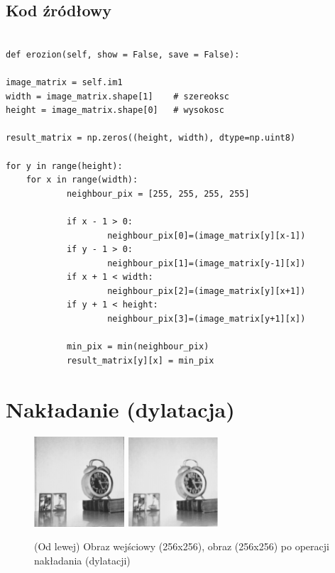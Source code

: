 \documentclass[final,a4paper,openany,12pt]{mwbk}
\begin{document}
\subsection*{Kod źródłowy}

\begin{lstlisting}[caption= Operacja okrawania (erozji) na obrazie szarym]

def erozion(self, show = False, save = False):

image_matrix = self.im1
width = image_matrix.shape[1]    # szereoksc
height = image_matrix.shape[0]   # wysokosc

result_matrix = np.zeros((height, width), dtype=np.uint8)

for y in range(height):
    for x in range(width):  
            neighbour_pix = [255, 255, 255, 255]

            if x - 1 > 0:
                    neighbour_pix[0]=(image_matrix[y][x-1])
            if y - 1 > 0:
                    neighbour_pix[1]=(image_matrix[y-1][x])
            if x + 1 < width:
                    neighbour_pix[2]=(image_matrix[y][x+1])
            if y + 1 < height:
                    neighbour_pix[3]=(image_matrix[y+1][x])

            min_pix = min(neighbour_pix)
            result_matrix[y][x] = min_pix

\end{lstlisting}

\section{ Nakładanie (dylatacja)}

\begin{figure}[H]
	\begin{center}
		\includegraphics[width=0.3\textwidth]{1/1Gray_D_Original}
		\includegraphics[width=0.3\textwidth]{1/1Gray_D_Result}
	\end{center}
	\caption{(Od lewej) Obraz wejściowy (256x256), obraz (256x256) po operacji nakładania (dylatacji) }
\end{figure}
\end{document}
